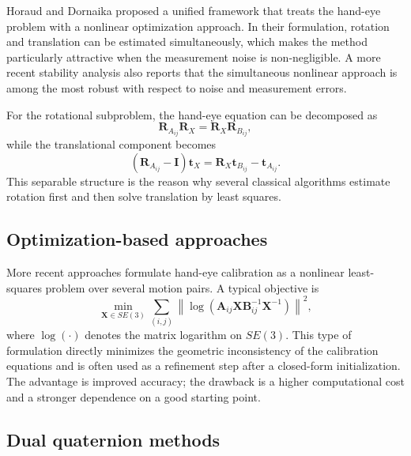 Horaud and Dornaika proposed a unified framework that treats the hand-eye problem with a nonlinear optimization approach. In their formulation, rotation and translation can be estimated simultaneously, which makes the method particularly attractive when the measurement noise is non-negligible. A more recent stability analysis also reports that the simultaneous nonlinear approach is among the most robust with respect to noise and measurement errors. \cite{HoraudDornaika1995,HoraudDornaika2023}

For the rotational subproblem, the hand-eye equation can be decomposed as
\begin{equation}
\mathbf{R}_{A_{ij}}\mathbf{R}_X = \mathbf{R}_X \mathbf{R}_{B_{ij}},
\end{equation}
while the translational component becomes
\begin{equation}
\left(\mathbf{R}_{A_{ij}} - \mathbf{I}\right)\mathbf{t}_X =
\mathbf{R}_X\mathbf{t}_{B_{ij}} - \mathbf{t}_{A_{ij}}.
\label{eq:translation}
\end{equation}
This separable structure is the reason why several classical algorithms estimate rotation first and then solve translation by least squares. \cite{Tsai1989,ParkMartin1994}

\subsection*{Optimization-based approaches}

More recent approaches formulate hand-eye calibration as a nonlinear least-squares problem over several motion pairs. A typical objective is
\begin{equation}
\min_{\mathbf{X}\in SE(3)} \sum_{(i,j)} \left\|
\log\!\left(\mathbf{A}_{ij}\mathbf{X}\mathbf{B}_{ij}^{-1}\mathbf{X}^{-1}\right)
\right\|^2,
\label{eq:nonlinear_objective}
\end{equation}
where \(\log(\cdot)\) denotes the matrix logarithm on \(SE(3)\). This type of formulation directly minimizes the geometric inconsistency of the calibration equations and is often used as a refinement step after a closed-form initialization. The advantage is improved accuracy; the drawback is a higher computational cost and a stronger dependence on a good starting point. \cite{HoraudDornaika2023,Enebuse2022}

\subsection*{Dual quaternion methods}

